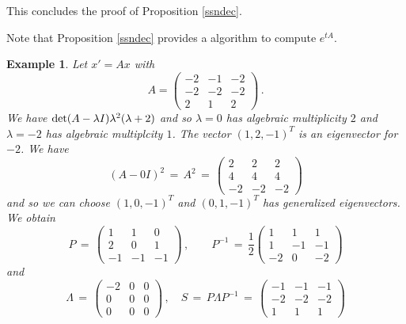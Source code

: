 \documentclass[12pt]{report}
\newtheorem{example}[theorem]{Example}
\def\qed{\hbox{\hskip 6pt\vrule width6pt height7pt depth1pt
    \hskip1pt}\bigskip}
\begin{document}
This concludes the proof of Proposition \ref{ssndec}. \hfill \qed


Note that Proposition \ref{ssndec} provides a algorithm to compute $e^{tA}$.  



\begin{example}{\rm  Let $x'=Ax$ with  \begin{equation}
A=\left( \begin{array}{rrr} -2 & -1 & -2 \\ -2 & -2 & -2 \\ 2 & 1 & 2 \end{array} \right)\,.
\end{equation} 
We have ${\rm det}(A-\lambda I) \lambda^2 (\lambda +2)$ and so $\lambda=0$ has algebraic 
multiplicity $2$ and $\lambda=-2$ has algebraic multiplcity $1$.   The vector $(1,2,-1)^T$ is an 
eigenvector for $-2$.  We have 
\begin{equation}
(A-0I)^2 \,=\, A^2 \,=\, \left( \begin{array}{rrr} 2 & 2 & 2 \\ 4 & 4 & 4 \\ -2 & -2 & -2 \end{array} \right)
 \end{equation}
 and so we can choose $(1,0,-1)^T$ and $(0,1,-1)^T$ has generalized eigenvectors. 
We obtain 
\begin{equation}
P\,=\, \left( \begin{array}{rrr} 1 & 1 & 0 \\ 2 & 0 & 1 \\ -1 & -1 & -1 \end{array} \right) \,, \quad \quad 
P^{-1}\,=\, \frac{1}{2} \left( \begin{array}{rrr} 1 & 1 & 1 \\ 1 & -1 & -1 \\ -2 & 0 & -2 \end{array} \right) 
\end{equation}
and 
\begin{equation}
\Lambda\,=\, \left( \begin{array}{rrr} -2 & 0 & 0 \\ 0 & 0 & 0 \\ 0 & 0 & 0 \end{array} \right)\,,\quad 
S \,=\, P \Lambda P^{-1}  \,=\, \left( \begin{array}{rrr} -1 & -1 & -1 \\ -2 & -2 & -2 \\ 1 & 1 & 1 \end{array} \right)

\end{equation}}
\end{example}
\end{document}
